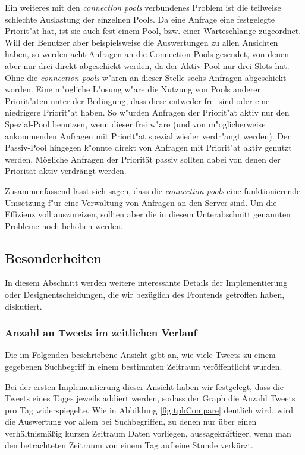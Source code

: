 Ein weiteres mit den \textit{connection pools} verbundenes Problem ist die teilweise schlechte Auslastung der einzelnen Pools. Da eine Anfrage eine festgelegte Priorit"at hat, ist sie auch fest einem Pool, bzw. einer Warteschlange zugeordnet. Will der Benutzer aber beispielsweise die Auswertungen zu allen Ansichten haben, so werden acht Anfragen an die Connection Pools gesendet, von denen aber nur drei direkt abgeschickt werden, da der Aktiv-Pool nur drei Slots hat. Ohne die \textit{connection pools} w"aren an dieser Stelle sechs Anfragen abgeschickt worden. Eine m"ogliche L"osung w"are die Nutzung von Pools anderer Priorit"aten unter der Bedingung, dass diese entweder frei sind oder eine niedrigere Priorit"at haben. So w"urden Anfragen der Priorit"at aktiv nur den Spezial-Pool benutzen, wenn dieser frei w"are (und von m"oglicherweise ankommenden Anfragen mit Priorit"at spezial wieder verdr"angt werden). Der Passiv-Pool hingegen k"onnte direkt von Anfragen mit Priorit"at aktiv genutzt werden. Mögliche Anfragen der Priorität passiv sollten dabei von denen der Priorität aktiv verdrängt werden.

Zusammenfassend lässt sich sagen, dass die \textit{connection pools} eine funktionierende Umsetzung f"ur eine Verwaltung von Anfragen an den Server sind. Um die Effizienz voll auszureizen, sollten aber die in diesem Unterabschnitt genannten Probleme noch behoben werden.

\subsection{Besonderheiten}

In diesem Abschnitt werden weitere interessante Details der Implementierung oder Designentscheidungen, die wir bezüglich des Frontends getroffen haben, diskutiert.

\subsubsection{Anzahl an Tweets im zeitlichen Verlauf}

Die im Folgenden beschriebene Ansicht gibt an, wie viele Tweets zu einem gegebenen Suchbegriff in einem bestimmten Zeitraum veröffentlicht wurden.

Bei der ersten Implementierung dieser Ansicht haben wir festgelegt, dass die Tweets eines Tages jeweils addiert werden, sodass der Graph die Anzahl Tweets pro Tag widerspiegelte.
Wie in Abbildung \ref{fig:tphCompare} deutlich wird, wird die Auswertung vor allem bei Suchbegriffen, zu denen nur über einen verhältnismäßig kurzen Zeitraum Daten vorliegen, aussagekräftiger, wenn man den betrachteten Zeitraum von einem Tag auf eine Stunde verkürzt.

